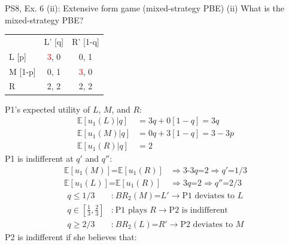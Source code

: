 \begin{frame}{PS8, Ex. 6 (ii): Extensive form game (mixed-strategy PBE)}
    (ii) What is the mixed-strategy PBE? \vspace{-10pt}
    \begin{multicols}{2}
      \begin{table}
        \begin{tabular}{l|c|c|}
          \multicolumn{1}{c}{} & \multicolumn{1}{c}{L' [q]} & \multicolumn{1}{c}{R' [1-q]} \\\cline{2-3}
          L [p]   & \textcolor{red}{3}, 0 & 0, \color{blue}1 \\\cline{2-3}
          M [1-p] & 0, \color{blue}1 & \textcolor{red}{3}, 0 \\\cline{2-3}
          R       & 2, \color{blue}2 & 2, \color{blue}2 \\\cline{2-3}
        \end{tabular}
      \end{table} \vspace{-6pt}
      P1's expected utility of $L$, $M$, and $R$: \vspace{-8pt}
      \begin{align*}
        \mathbb{E}[u_1(L)|q]&=3q+0[1-q]=3q\\
        \mathbb{E}[u_1(M)|q]&=0q+3[1-q]=3-3p\\
        \mathbb{E}[u_1(R)|q]&=2
      \end{align*}
      P1 is indifferent at $q'$ and $q''$: \vspace{-8pt}
      \begin{align*}
        \mathbb{E}[u_1(M)]\text{=}\mathbb{E}[u_1(R)]&\Rightarrow \text{3-3}q\text{=}2\Rightarrow q'\text{=}1/3\\
        \mathbb{E}[u_1(L)]\text{=}\mathbb{E}[u_1(R)]&\Rightarrow 3q\text{=}2\Rightarrow q''\text{=}2/3
      \end{align*} \vspace{-22pt}
      \begin{align*}
        q\leq1/3&\text{:}\ BR_2(M)\text{=}L'\rightarrow\text{P1 deviates to }L\\
        q\text{$\in$}{\textstyle\left[\frac{1}{3},\frac{2}{3}\right]}&\text{:}\ \text{P1 plays }R\rightarrow\text{P2 is indifferent}\\
        q\geq2/3&\text{:}\ BR_2(L)\text{=}R'\rightarrow\text{P2 deviates to }M
      \end{align*}
      P2 is indifferent if she believes that: \vspace{-8pt}

\end{multicols}
\end{frame}
